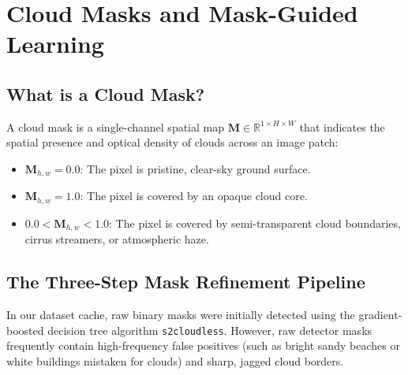 \chapter{Cloud Masks and Mask-Guided Learning}
\label{chap:ch08}

\section{What is a Cloud Mask?}
A cloud mask is a single-channel spatial map $\mathbf{M} \in \mathbb{R}^{1 \times H \times W}$ that indicates the spatial presence and optical density of clouds across an image patch:
\begin{itemize}
    \item $\mathbf{M}_{h,w} = 0.0$: The pixel is pristine, clear-sky ground surface.
    \item $\mathbf{M}_{h,w} = 1.0$: The pixel is covered by an opaque cloud core.
    \item $0.0 < \mathbf{M}_{h,w} < 1.0$: The pixel is covered by semi-transparent cloud boundaries, cirrus streamers, or atmospheric haze.
\end{itemize}

\section{The Three-Step Mask Refinement Pipeline}
In our dataset cache, raw binary masks were initially detected using the gradient-boosted decision tree algorithm \texttt{s2cloudless}. However, raw detector masks frequently contain high-frequency false positives (such as bright sandy beaches or white buildings mistaken for clouds) and sharp, jagged cloud borders.

